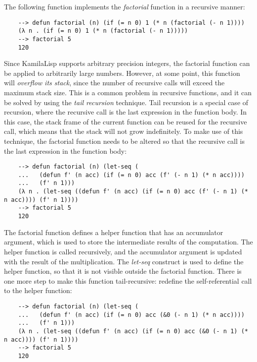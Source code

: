 The following function implements the \textit{factorial} function in a recursive manner:

\begin{Verbatim}
    --> defun factorial (n) (if (= n 0) 1 (* n (factorial (- n 1))))
    (λ n . (if (= n 0) 1 (* n (factorial (- n 1)))))
    --> factorial 5
    120
\end{Verbatim}

Since KamilaLisp supports arbitrary precision integers, the factorial function can be applied to arbitrarily large numbers. However, at some point, this function will \textit{overflow its stack}, since the number of recursive calls will exceed the maximum stack size. This is a common problem in recursive functions, and it can be solved by using the \textit{tail recursion} technique. Tail recursion is a special case of recursion, where the recursive call is the last expression in the function body. In this case, the stack frame of the current function can be reused for the recursive call, which means that the stack will not grow indefinitely. To make use of this technique, the factorial function needs to be altered so that the recursive call is the last expression in the function body:

\begin{Verbatim}
    --> defun factorial (n) (let-seq (
    ...   (defun f' (n acc) (if (= n 0) acc (f' (- n 1) (* n acc))))
    ...   (f' n 1)))
    (λ n . (let-seq ((defun f' (n acc) (if (= n 0) acc (f' (- n 1) (* n acc)))) (f' n 1))))
    --> factorial 5
    120
\end{Verbatim}

The factorial function defines a helper function that has an accumulator argument, which is used to store the intermediate results of the computation. The helper function is called recursively, and the accumulator argument is updated with the result of the multiplication. The \textit{let-seq} construct is used to define the helper function, so that it is not visible outside the factorial function. There is one more step to make this function tail-recursive: redefine the self-referential call to the helper function:

\begin{Verbatim}
    --> defun factorial (n) (let-seq (
    ...   (defun f' (n acc) (if (= n 0) acc (&0 (- n 1) (* n acc))))
    ...   (f' n 1)))
    (λ n . (let-seq ((defun f' (n acc) (if (= n 0) acc (&0 (- n 1) (* n acc)))) (f' n 1))))
    --> factorial 5
    120
\end{Verbatim}

